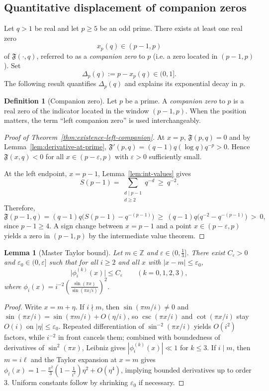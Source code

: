 \documentclass[11pt,a4paper]{amsart}
\theoremstyle{plain}
\newtheorem{lemma}[theorem]{Lemma}
\theoremstyle{definition}
\newtheorem{definition}[theorem]{Definition}
\theoremstyle{remark}
\begin{document}
\subsection{Quantitative displacement of companion zeros}\label{sec:companion-displacement}
Let $q>1$ be real and let $p\ge5$ be an odd prime. There exists at least one real zero 
\[
x_p(q)\in(p-1,p)
\]
of $\mathfrak F(\cdot,q)$, referred to as a \emph{companion zero} to $p$ (i.e. a zero located in $(p-1,p)$). Set
\[
\Delta_p(q):=p-x_p(q)\in(0,1].
\]
The following result quantifies $\Delta_p(q)$ and explains its exponential decay in $p$.

\begin{definition}[Companion zero]\label{def:companion-zero}
Let $p$ be a prime. A \emph{companion zero} to $p$ is a real zero of the indicator located in the window $(p-1,p)$. When the position matters, the term “left companion zero” is used interchangeably.
\end{definition}

\begin{proof}[Proof of Theorem~\ref{thm:existence-left-companion}]
At $x=p$, $\mathfrak F(p,q)=0$ and by Lemma~\ref{lem:derivative-at-prime},
$\mathfrak F'(p,q)=(q-1)q(\log q)q^{-p}>0$. Hence $\mathfrak F(x,q)<0$ for all $x\in(p-\varepsilon,p)$ with $\varepsilon>0$ sufficiently small.

At the left endpoint, $x=p-1$, Lemma~\ref{lem:int-values} gives
\[
S(p-1)=\sum_{\substack{d\mid p-1\\ d\ge2}}q^{-d} \ \ge\ q^{-2}.
\]
Therefore,
\[
\mathfrak F(p-1,q)=(q-1)q\big(S(p-1)-q^{-(p-1)}\big)\ \ge\ (q-1)q\big(q^{-2}-q^{-(p-1)}\big)\ >\ 0,
\]
since $p-1\ge4$. A sign change between $x=p-1$ and a point $x\in(p-\varepsilon,p)$ yields a zero in $(p-1,p)$ by the intermediate value theorem.
\end{proof}

\begin{lemma}[Master Taylor bound]
Let $m\in\mathbb{Z}$ and $\varepsilon\in(0,\tfrac13]$. There exist $C_\varepsilon>0$ and $\varepsilon_0\in(0,\varepsilon]$ such that for all $i\ge2$ and all $x$ with $|x-m|\le\varepsilon_0$,
\[
\bigl|\phi_i^{(k)}(x)\bigr|\le C_\varepsilon\qquad (k=0,1,2,3),
\]
where $\phi_i(x)=i^{-2}\left(\frac{\sin(\pi x)}{\sin(\pi x/i)}\right)^2$.
\end{lemma}

\begin{proof}
Write $x=m+\eta$. If $i\nmid m$, then $\sin(\pi m/i)\neq0$ and $\sin(\pi x/i)=\sin(\pi m/i)+O(\eta/i)$, so $\csc(\pi x/i)$ and $\cot(\pi x/i)$ stay $O(i)$ on $|\eta|\le\varepsilon_0$. Repeated differentiation of $\sin^{-2}(\pi x/i)$ yields $O(i^2)$ factors, while $i^{-2}$ in front cancels them; combined with boundedness of derivatives of $\sin^2(\pi x)$, Leibniz gives $|\phi_i^{(k)}(x)|\ll1$ for $k\le3$. If $i\mid m$, then $m=i\ell$ and the Taylor expansion at $x=m$ gives $\phi_i(x)=1-\frac{\pi^2}{3}(1-\frac1{i^2})\eta^2+O(\eta^4)$, implying bounded derivatives up to order $3$. Uniform constants follow by shrinking $\varepsilon_0$ if necessary.
\end{proof}
\end{document}
